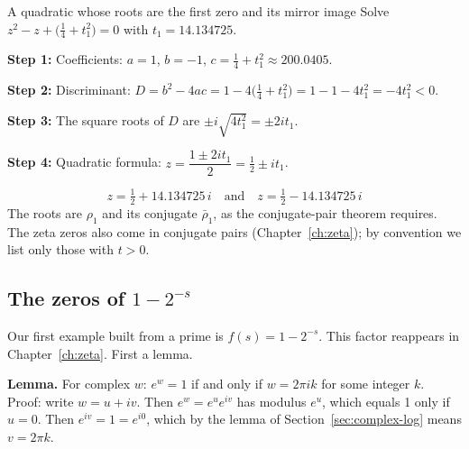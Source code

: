 \begin{sample}{A quadratic whose roots are the first zero and its mirror image}
Solve $z^2-z+\bigl(\tfrac14+t_1^2\bigr)=0$ with $t_1=14.134725$.

\textbf{Step 1:} Coefficients: $a=1$, $b=-1$, $c=\tfrac14+t_1^2\approx200.0405$.

\textbf{Step 2:} Discriminant: $D=b^2-4ac=1-4\bigl(\tfrac14+t_1^2\bigr)=1-1-4t_1^2=-4t_1^2<0$.

\textbf{Step 3:} The square roots of $D$ are $\pm i\sqrt{4t_1^2}=\pm 2it_1$.

\textbf{Step 4:} Quadratic formula: $z=\dfrac{1\pm2it_1}{2}=\tfrac12\pm it_1$.

\[
\boxed{z=\tfrac12+14.134725\,i\quad\text{and}\quad z=\tfrac12-14.134725\,i}
\]
The roots are $\rho_1$ and its conjugate $\bar\rho_1$, as the conjugate-pair theorem requires. The zeta zeros also come in conjugate pairs (Chapter~\ref{ch:zeta}); by convention we list only those with $t>0$.
\end{sample}

\subsection{The zeros of $1-2^{-s}$}

Our first example built from a prime is $f(s)=1-2^{-s}$. This factor reappears in Chapter~\ref{ch:zeta}. First a lemma.

\textbf{Lemma.} For complex $w$: $e^{w}=1$ if and only if $w=2\pi ik$ for some integer $k$.
Proof: write $w=u+iv$. Then $e^w=e^ue^{iv}$ has modulus $e^u$, which equals 1 only if $u=0$. Then $e^{iv}=1=e^{i0}$, which by the lemma of Section~\ref{sec:complex-log} means $v=2\pi k$.

